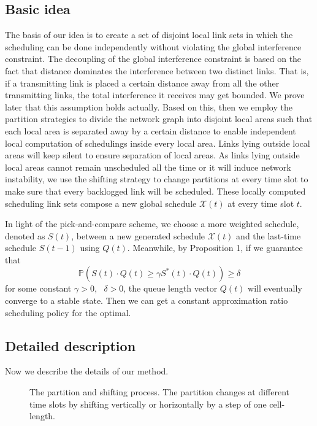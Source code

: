 \documentclass[journal]{IEEEtran}
\begin{document}
\subsection{Basic idea}
The basis of our idea is to create a set of disjoint local link sets in which the scheduling can be done independently without violating the global interference constraint. The decoupling of the global interference constraint is based on the fact that distance dominates the interference between two distinct links. That is, if a transmitting link is placed a certain distance away from all the other transmitting links, the total interference it receives may get bounded. We prove later that this assumption holds actually.
Based on this, then we employ the partition strategies to divide the network graph into disjoint local areas such that each local area is separated away by a certain distance to enable independent local computation of schedulings inside every
local area. Links lying outside local areas will keep silent to ensure
separation of local areas. As links lying outside local areas cannot remain
unscheduled all the time or it will induce network instability, we use the
shifting strategy to change partitions at every time slot to make sure that every
backlogged link will be scheduled. These locally computed scheduling link sets
compose a new global schedule $\mathcal{X}(t)$ at every time slot $t$.

In light of the pick-and-compare scheme, we choose a more weighted schedule, denoted as $S(t)$,
between a new generated schedule $\mathcal{X}(t)$ and the last-time schedule
$S(t-1)$ using $Q(t)$. Meanwhile, by Proposition 1, if we guarantee
that
\begin{equation}
\mathbb{P}(S(t)\cdot Q(t)\ge \gamma S^\ast (t)\cdot Q(t))\ge \delta
\end{equation}
for some constant $\gamma >0,\mbox{ }\delta >0$, the queue length vector $Q(t)$
will eventually converge to a stable state. Then we can get a constant approximation ratio scheduling policy for the optimal.
\vspace*{-0.5\baselineskip}

\subsection{Detailed description}
Now we describe the details of our method.
\setlength{\textfloatsep}{3pt plus 1pt minus 1pt}
\begin{figure}
\centering
{}
\hfill
\centering
{}

\caption{The partition and shifting process. The partition changes at different time slots by shifting vertically or horizontally by a step of one cell-length. }
\end{figure}
\end{document}
